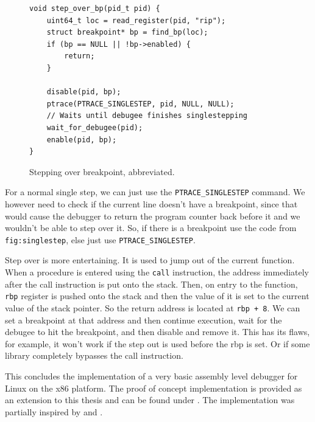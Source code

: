 \begin{figure}\label{fig:singlestep}
    \begin{verbatim}
void step_over_bp(pid_t pid) {
    uint64_t loc = read_register(pid, "rip");
    struct breakpoint* bp = find_bp(loc);
    if (bp == NULL || !bp->enabled) {
        return;
    }

    disable(pid, bp);
    ptrace(PTRACE_SINGLESTEP, pid, NULL, NULL);
    // Waits until debugee finishes singlestepping
    wait_for_debugee(pid);
    enable(pid, bp);
}
    \end{verbatim}
    \caption{Stepping over breakpoint, abbreviated.}
\end{figure}

For a normal single step, we can just use the \texttt{PTRACE\_SINGLESTEP}
command. We however need to check if the current line doesn't have a
breakpoint, since that would cause the debugger to return the program counter
back before it and we wouldn't be able to step over it. So, if there is a
breakpoint use the code from \texttt{fig:singlestep}, else just use
\texttt{PTRACE\_SINGLESTEP}.

Step over is more entertaining. It is used to jump out of the current function.
When a procedure is entered using the \texttt{call} instruction, the address
immediately after the call instruction is put onto the stack. Then, on entry to
the function, \texttt{rbp} register is pushed onto the stack and then the value
of it is set to the current value of the stack pointer. So the return address
is located at \texttt{rbp + 8}. We can set a breakpoint at that address and
then continue execution, wait for the debugee to hit the breakpoint, and then
disable and remove it. This has its flaws, for example, it won't work if the
step out is used before the rbp is set. Or if some library completely bypasses
the call instruction.

This concludes the implementation of a very basic assembly level debugger for
Linux on the x86 platform. The proof of concept implementation is provided as
an extension to this thesis and can be found under . The implementation was partially inspired by
\cite{linux-debugger-blog} and \cite{lldb}.

